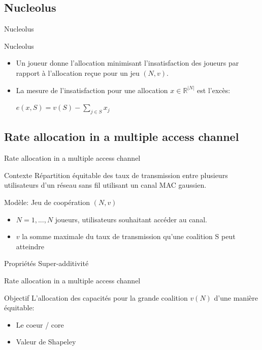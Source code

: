 \documentclass{isimabeamer}
\begin{document}
\subsection{Nucleolus}
\begin{frame}{Nucleolus}
\begin{block}{Nucleolus}
\begin{itemize}
    \item Un joueur donne l'allocation minimisant l'insatisfaction des joueurs par rapport à l'allocation reçue pour un jeu $(N,v)$.  
    \item La mesure de l'insatisfaction pour une allocation $x \in \mathbb{R}^{|N|}$ est l'excès: 
    
    $e(x, S) = v(S) - \sum_{j\in S} x_j$
    
\end{itemize}
\end{block}
\end{frame}


\subsection{Rate allocation in a multiple access channel}
\begin{frame}{Rate allocation in a multiple access channel}
\begin{block}{Contexte}
Répartition équitable des taux de transmission entre plusieurs utilisateurs d'un réseau sans fil utilisant un canal MAC gaussien.
\end{block}
\begin{block}{Modèle: Jeu de coopération $(N,v)$}
\begin{itemize}
  \item $N = {1,...,N}$ joueurs, utilisateurs souhaitant accéder au canal.
        \item $v$ la somme maximale du taux de transmission qu'une coalition S peut atteindre
\end{itemize}

\end{block}

\begin{block}{Propriétés}
Super-additivité 
\end{block}

\end{frame}



\begin{frame}{Rate allocation in a multiple access channel}
\begin{block}{Objectif}
L'allocation des capacités pour la grande coalition $v(N)$ d'une manière équitable:
\begin{itemize}
    \item Le coeur / core
    \item Valeur de Shapeley
\end{itemize}
\end{block}
\end{frame}
\end{document}
